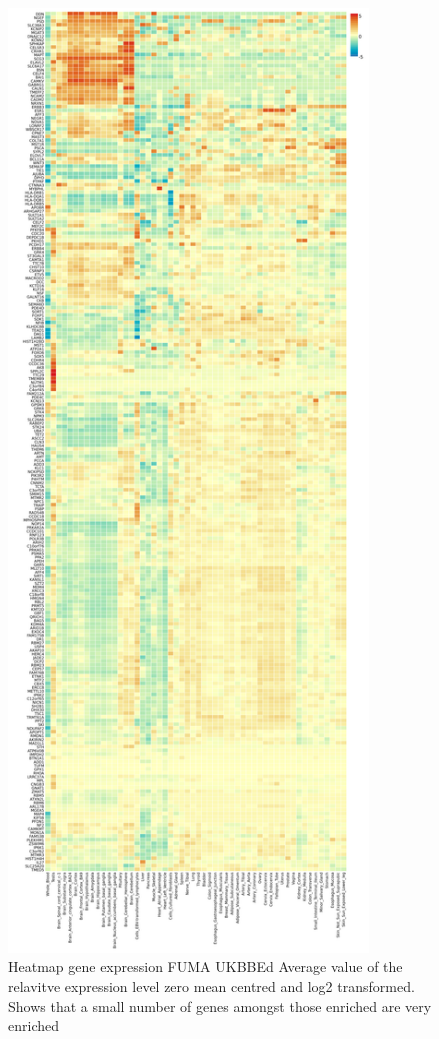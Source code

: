 \begin{figure}
    \centering
    \includegraphics[height=25cm]{images/FUMA_plots/expHeat_FUMA_gene2func-2_ukbbed_zeromean.png}
    \caption{Heatmap gene expression FUMA UKBBEd Average value of the relavitve expression level zero mean centred and log2 transformed. Shows that a small number of genes amongst those enriched are very enriched}
    \label{fig:my_label}
\end{figure}
